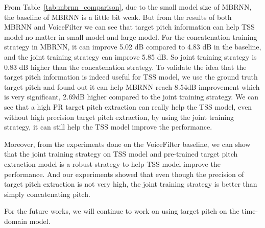 From Table~\ref{tab:mbrnn_comparison}, due to the small model size of MBRNN, the baseline of MBRNN is a little bit weak. But from the results of both MBRNN and VoiceFilter we can see that target pitch information can help TSS model no matter in small model and large model.
For the concatenation training strategy in MBRNN, it can improve 5.02 dB compared to 4.83 dB in the baseline, and the joint training strategy can improve 5.85 dB. So joint training strategy is 0.83 dB higher than the concatenation strategy.
To validate the idea that the target pitch information is indeed useful for TSS model, we use the ground truth target pitch and found out it can help MBRNN reach 8.54dB improvement which is very significant, 2.69dB higher compared to the joint training strategy.
We can see that a high PR target pitch extraction can really help the TSS model, even without high precision target pitch extraction, by using the joint training strategy, it can still help the TSS model improve the performance.

Moreover, from the experiments done on the VoiceFilter baseline, we can show that the joint training strategy on TSS model and pre-trained target pitch extraction model is a robust strategy to help TSS model improve the performance.
And our experiments showed that even though the precision of target pitch extraction is not very high, the joint training strategy is better than simply concatenating pitch.

For the future works, we will continue to work on using target pitch on the time-domain model.

